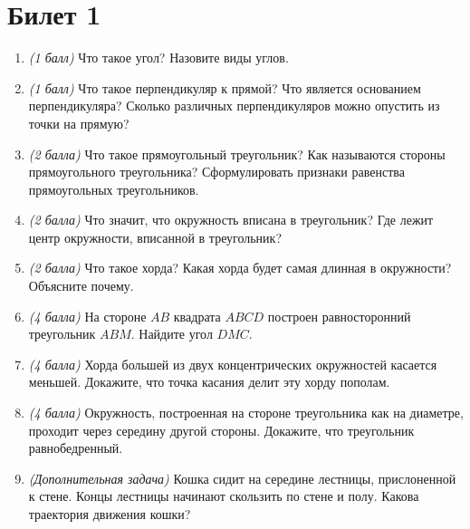 \documentclass[12pt, a4paper]{article}
\begin{document}
\section*{Билет 1}
\begin{enumerate}
	\item \textit{(1 балл)} Что такое угол? Назовите виды углов.
	\item \textit{(1 балл)} Что такое перпендикуляр к прямой? Что является основанием перпендикуляра? Сколько различных перпендикуляров можно опустить из точки на прямую?
	\item \textit{(2 балла)} Что такое прямоугольный треугольник? Как называются стороны прямоугольного треугольника? Сформулировать признаки равенства прямоугольных треугольников.
	\item \textit{(2 балла)} Что значит, что окружность вписана в треугольник? Где лежит центр окружности, вписанной в треугольник?
	\item \textit{(2 балла)} Что такое хорда? Какая хорда будет самая длинная в окружности? Объясните почему.
	\item \textit{(4 балла)} На стороне $AB$ квадрата $ABCD$ построен равносторонний треугольник $ABM$. Найдите угол $DMC$.
	\item \textit{(4 балла)} Хорда большей из двух концентрических окружностей касается меньшей. Докажите, что точка касания делит эту хорду пополам.
	\item \textit{(4 балла)} Окружность, построенная на стороне треугольника как на диаметре, проходит через середину другой стороны. Докажите, что треугольник равнобедренный.
	\item \textit{(Дополнительная задача)} Кошка сидит на середине лестницы, прислоненной к стене. Концы лестницы начинают скользить по стене и полу. Какова траектория движения кошки?
\end{enumerate}
\end{document}
